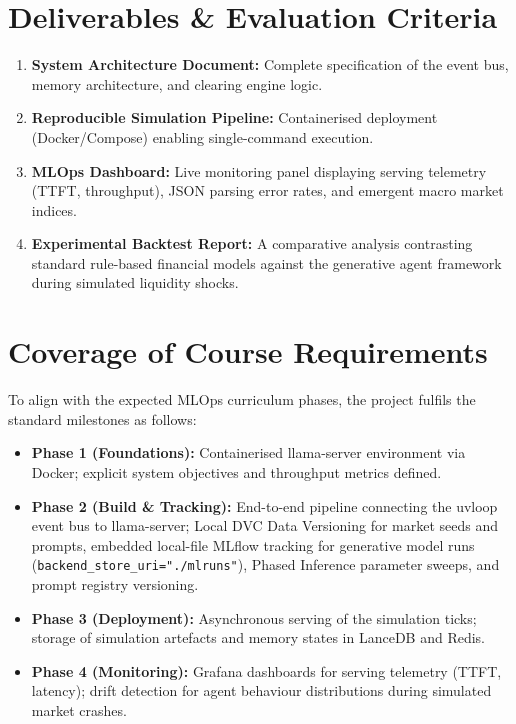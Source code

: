 \documentclass[10pt,a4paper]{article}
\begin{document}
\section{Deliverables \& Evaluation Criteria}

\begin{enumerate}
    \item \textbf{System Architecture Document:} Complete specification of the event bus, memory architecture, and clearing engine logic.
    \item \textbf{Reproducible Simulation Pipeline:} Containerised deployment (Docker/Compose) enabling single-command execution.
    \item \textbf{MLOps Dashboard:} Live monitoring panel displaying serving telemetry (TTFT, throughput), JSON parsing error rates, and emergent macro market indices.
    \item \textbf{Experimental Backtest Report:} A comparative analysis contrasting standard rule-based financial models against the generative agent framework during simulated liquidity shocks.
\end{enumerate}

\section{Coverage of Course Requirements}

To align with the expected MLOps curriculum phases, the project fulfils the standard milestones as follows:

\begin{itemize}
    \item \textbf{Phase 1 (Foundations):} Containerised llama-server environment via Docker; explicit system objectives and throughput metrics defined.
    \item \textbf{Phase 2 (Build \& Tracking):} End-to-end pipeline connecting the uvloop event bus to llama-server; Local DVC Data Versioning for market seeds and prompts, embedded local-file MLflow tracking for generative model runs (\texttt{backend\_store\_uri="./mlruns"}), Phased Inference parameter sweeps, and prompt registry versioning.
    \item \textbf{Phase 3 (Deployment):} Asynchronous serving of the simulation ticks; storage of simulation artefacts and memory states in LanceDB and Redis.
    \item \textbf{Phase 4 (Monitoring):} Grafana dashboards for serving telemetry (TTFT, latency); drift detection for agent behaviour distributions during simulated market crashes.
\end{itemize}
\end{document}
